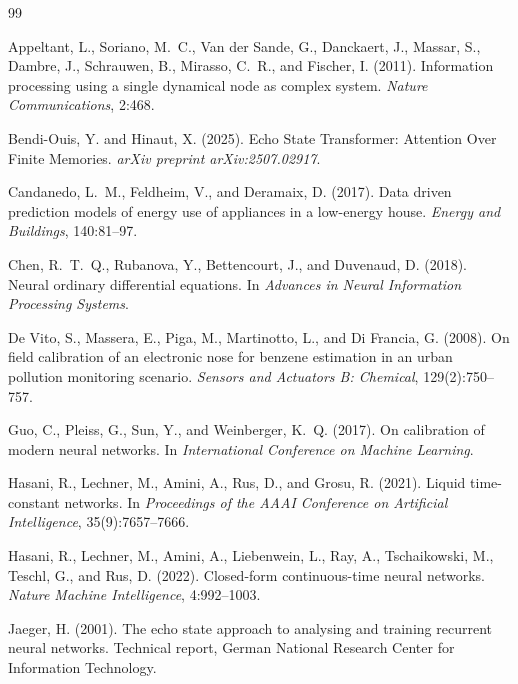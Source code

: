 \documentclass[11pt,a4paper]{article}
\begin{document}
\begin{thebibliography}{99}

Appeltant, L., Soriano, M.~C., Van der Sande, G., Danckaert, J., Massar, S., Dambre, J., Schrauwen, B., Mirasso, C.~R., and Fischer, I. (2011).
Information processing using a single dynamical node as complex system.
\emph{Nature Communications}, 2:468.


Bendi-Ouis, Y. and Hinaut, X. (2025).
Echo State Transformer: Attention Over Finite Memories.
\emph{arXiv preprint arXiv:2507.02917}.

Candanedo, L.~M., Feldheim, V., and Deramaix, D. (2017).
Data driven prediction models of energy use of appliances in a low-energy house.
\emph{Energy and Buildings}, 140:81--97.

Chen, R.~T.~Q., Rubanova, Y., Bettencourt, J., and Duvenaud, D. (2018).
Neural ordinary differential equations.
In \emph{Advances in Neural Information Processing Systems}.

De Vito, S., Massera, E., Piga, M., Martinotto, L., and Di Francia, G. (2008).
On field calibration of an electronic nose for benzene estimation in an urban pollution monitoring scenario.
\emph{Sensors and Actuators B: Chemical}, 129(2):750--757.

Guo, C., Pleiss, G., Sun, Y., and Weinberger, K.~Q. (2017).
On calibration of modern neural networks.
In \emph{International Conference on Machine Learning}.

Hasani, R., Lechner, M., Amini, A., Rus, D., and Grosu, R. (2021).
Liquid time-constant networks.
In \emph{Proceedings of the AAAI Conference on Artificial Intelligence}, 35(9):7657--7666.

Hasani, R., Lechner, M., Amini, A., Liebenwein, L., Ray, A., Tschaikowski, M., Teschl, G., and Rus, D. (2022).
Closed-form continuous-time neural networks.
\emph{Nature Machine Intelligence}, 4:992--1003.

Jaeger, H. (2001).
The echo state approach to analysing and training recurrent neural networks.
Technical report, German National Research Center for Information Technology.


\end{thebibliography}
\end{document}
